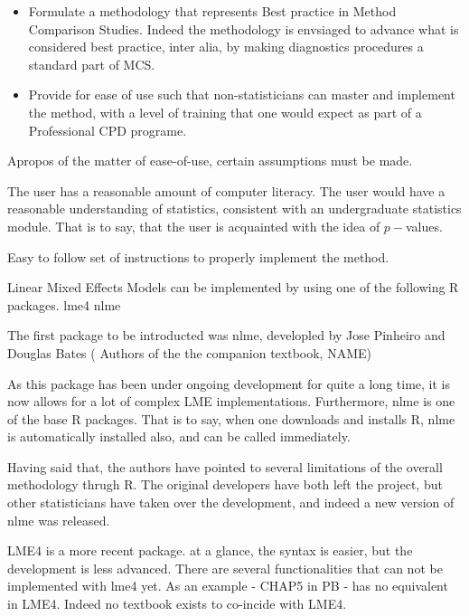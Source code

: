 \documentclass[12pt, a4paper]{report}
\theoremstyle{plain}
\theoremstyle{definition}
\theoremstyle{remark}
\begin{document}
\begin{itemize}
	\item Formulate a methodology that represents Best practice in Method Comparison Studies. Indeed the methodology is envsiaged to advance what is considered best practice, inter alia, by making diagnostics procedures a standard part of MCS. 
	
	\item Provide for ease of use such that non-statisticians can master and implement the method, with a level of training that one would expect 
	as part of a Professional CPD programe.
	
\end{itemize}

Apropos of the matter of ease-of-use, certain assumptions must be made.


The user has a reasonable amount of computer literacy.
The user would have a reasonable understanding of statistics, consistent with an undergraduate statistics module. 
That is to say, that the user is acquainted with the idea of $p-$values.

Easy to follow set of instructions to properly implement the method.


Linear Mixed Effects Models can be implemented by using one of the following R packages.
lme4
nlme

The first package to be introducted was nlme, developled by Jose Pinheiro and Douglas Bates ( Authors of the the companion textbook, NAME)

As this package has been under ongoing development for quite a long time, it is now allows for a lot of complex LME implementations. 
Furthermore, nlme is one of the base R packages.  That is to say, when one downloads and installs R, nlme is automatically installed also, and can be called immediately.

Having said that, the authors have pointed to several limitations of the overall methodology thrugh R.
The original developers have both left the project, but other statisticians have taken over the development, and indeed a new version of nlme was released.

LME4 is a more recent package. at a glance, the syntax is easier, but the development is less advanced. There are several functionalities that can not be implemented with lme4 yet. 
As an example - CHAP5 in PB - has no equivalent in LME4. Indeed no textbook exists to co-incide with LME4.
\end{document}
